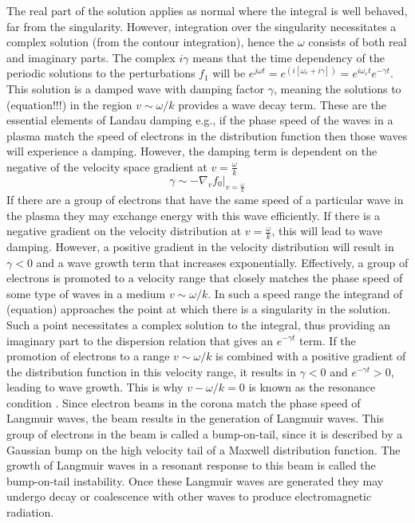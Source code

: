 The real part of the solution applies as normal where the integral is well behaved, far from the singularity. However, integration over the singularity necessitates a complex solution (from the contour integration), hence the $\omega$ consists of both real and imaginary parts.
The complex $i\gamma$ means that the time dependency of the periodic solutions to the perturbations $f_1$ will be $e^{j\omega t}=e^{(i[\omega_r + i\gamma])}=e^{i\omega_rt}e^{-\gamma t}$. This solution is a damped wave with damping factor $\gamma$, meaning the solutions to (equation!!!) in the region $v \sim \omega/k$ provides a wave decay term. These are the essential elements of Landau damping e.g., if the phase speed of the waves in a plasma match the speed of electrons in the distribution function then those waves will experience a damping. However, the damping term is dependent on the negative of the velocity space gradient at $v=\frac{\omega}{k}$ \citep{melrose1989}
\begin{equation}
\gamma \sim -\nabla_v f_0|_{v=\frac{\omega}{k}}
\end{equation}
If there are a group of electrons that have the same speed of a particular wave in the plasma they may exchange energy with this wave efficiently. If there is a negative gradient on the velocity distribution at $v=\frac{\omega}{k}$, this will lead to wave damping. However, a positive gradient in the velocity distribution will result in $\gamma <0$ and a wave growth term that increases exponentially. Effectively, %
a group of electrons is promoted to a velocity range that closely matches the phase speed of some type of waves in a medium $v \sim \omega/k$. In such a speed range the integrand of (equation) approaches the point at which there is a singularity in the solution. Such a point necessitates a complex solution to the integral, thus providing an imaginary part to the dispersion relation that gives an $e^{-\gamma t}$ term. If the promotion of electrons to a range $v \sim \omega/k$ is combined with a positive gradient of the distribution function in this velocity range, it results in $\gamma < 0$ and $e^{-\gamma t}>0$, leading to wave growth. This is why $v - \omega/k=0$ is known as the resonance condition \citep{melrose1989}. Since electron beams in the corona match the phase speed of Langmuir waves, the beam results in the generation of Langmuir waves. This group of electrons in the beam is called a bump-on-tail, since it is described by a Gaussian bump on the high velocity tail of a Maxwell distribution function. The growth of Langmuir waves in a resonant response to this beam is called the bump-on-tail instability. Once these Langmuir waves are generated they may undergo decay or coalescence with other waves to produce electromagnetic radiation. 

